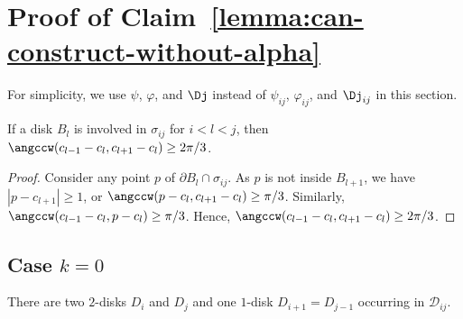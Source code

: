 \section{Proof of Claim~\ref{lemma:can-construct-without-alpha}}

For simplicity, we use $\psi$, $\varphi$, and $\Dj$ instead of $\psi_{ij}$, $\varphi_{ij}$, and $\Dj_{ij}$ in this section.

\begin{observation}\label{lemma:not-covered-2pi-3}
If a disk $B_l$ is involved in $\sigma_{ij}$ for $i < l < j$, then $\angccw(c_{l-1} - c_l, c_{l+1} - c_l)\geq 2\pi/3$.
\end{observation}

\begin{proof}
Consider any point $p$ of $\partial{B_l}\cap\sigma_{ij}$. As $p$ is not inside $B_{l+1}$, we have $|p - c_{l+1}|\geq 1$, or $\angccw(p - c_l, c_{l+1} - c_l)\geq\pi/3$. Similarly, $\angccw(c_{l-1} - c_l, p - c_l)\geq\pi/3$. Hence, $\angccw(c_{l-1} - c_l, c_{l+1} - c_l)\geq2\pi/3$.
\end{proof}

\subsection{Case $k = 0$}

There are two $2$-disks $D_i$ and $D_j$ and one $1$-disk $D_{i+1} = D_{j-1}$ occurring in $\mathcal{D}_{ij}$.

